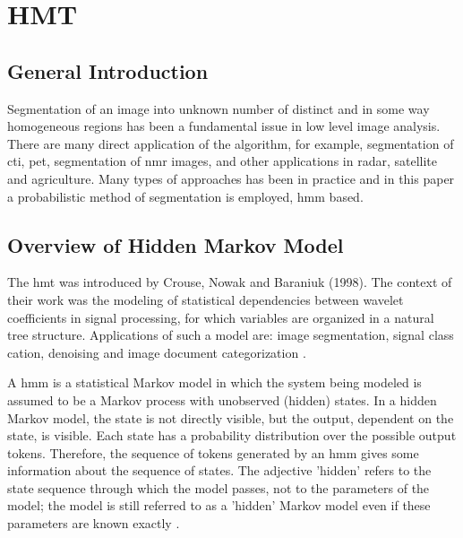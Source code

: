 \section{HMT}
\subsection{General Introduction}
Segmentation of an image into unknown number of distinct and in some way homogeneous regions has been a fundamental issue in low level image analysis. There are many direct application of the algorithm, for example, segmentation of \gls{cti}, \gls{pet}, segmentation of \gls{nmr} images, and other applications in radar, satellite and agriculture. Many types of approaches has been in practice and in this paper a probabilistic method of segmentation is employed, \gls{hmm} based.

\subsection{Overview of Hidden Markov Model}
The \gls{hmt} was introduced by Crouse, Nowak and Baraniuk (1998). The context of their work was the modeling of statistical dependencies between wavelet coefficients in signal processing, for which variables are organized in a natural tree structure. Applications of such a model are: image segmentation, signal class cation, denoising and image document categorization \cite{durand2001statistical}.

A \gls{hmm} is a statistical Markov model in which the system being modeled is assumed to be a Markov process with unobserved (hidden) states. In a hidden Markov model, the state is not directly visible, but the output, dependent on the state, is visible. Each state has a probability distribution over the possible output tokens. Therefore, the sequence of tokens generated by an \gls{hmm} gives some information about the sequence of states. The adjective 'hidden' refers to the state sequence through which the model passes, not to the parameters of the model; the model is still referred to as a 'hidden' Markov model even if these parameters are known exactly \cite{jezicagent}. 

